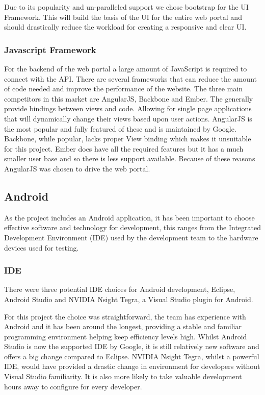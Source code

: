 \documentclass[11pt,a4paper]{article}
\begin{document}
Due to its popularity and un-paralleled support we chose bootstrap for the UI Framework. This will build the basis of the UI for the entire web portal and should drastically reduce the workload for creating a responsive and clear UI.

\subsubsection{Javascript Framework}
For the backend of the web portal a large amount of JavaScript is required to connect with the API. There are several frameworks that can reduce the amount of code needed and improve the performance of the website. The three main competitors in this market are AngularJS\cite{angular}, Backbone\cite{backbone} and Ember\cite{ember}. The generally provide bindings between views and code. Allowing for single page applications that will dynamically change their views based upon user actions. AngularJS is the most popular and fully featured of these and is maintained by Google. Backbone, while popular, lacks proper View binding which makes it unsuitable for this project. Ember does have all the required features but it has a much smaller user base and so there is less support available. Because of these reasons AngularJS was chosen to drive the web portal.

\subsection{Android}
As the project includes an Android application, it has been important to choose effective software and technology for development, this ranges from the Integrated Development Environment (IDE) used by the development team to the hardware devices used for testing.

\subsubsection{IDE}
There were three potential IDE choices for Android development, Eclipse, Android Studio and NVIDIA Nsight Tegra, a Visual Studio plugin for Android.

For this project the choice was straightforward, the team has experience with Android and it has been around the longest, providing a stable and familiar programming environment helping keep efficiency levels high. Whilst Android Studio is now the supported IDE by Google, it is still relatively new software and offers a big change compared to Eclipse. NVIDIA Nsight Tegra, whilst a powerful IDE, would have provided a drastic change in environment for developers without Visual Studio familiarity. It is also more likely to take valuable development hours away to configure for every developer.
\end{document}
